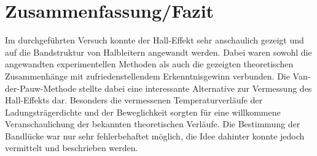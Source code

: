 \section{Zusammenfassung/Fazit}
Im durchgeführten Versuch konnte der Hall-Effekt sehr anschaulich gezeigt und auf die Bandstruktur von Halbleitern angewandt werden. Dabei waren sowohl die angewandten experimentellen Methoden als auch die gezeigten theoretischen Zusammenhänge mit zufriedenstellendem Erkenntnisgewinn verbunden. Die Van-der-Pauw-Methode stellte dabei eine interessante Alternative zur Vermessung des Hall-Effekts dar. Besonders die vermessenen Temperaturverläufe der Ladungsträgerdichte und der Beweglichkeit sorgten für eine willkommene Veranschaulichung der bekannten theoretischen Verläufe. Die Bestimmung der Bandlücke war nur sehr fehlerbehaftet möglich, die Idee dahinter konnte jedoch vermittelt und beschrieben werden.